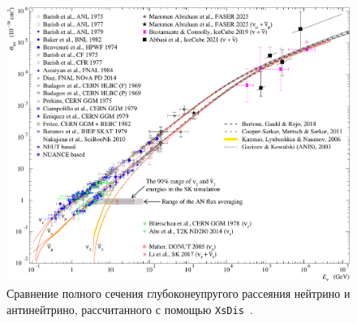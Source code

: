 \begin{figure}[!h]
\centering
\includegraphics[width=\linewidth]{images/dis_vs_data.pdf}
\caption{Сравнение полного сечения глубоконеупругого рассеяния нейтрино и антинейтрино, рассчитанного с помощью \texttt{XsDis}~\cite{kuzmin2006_finetuning,kuzmin2005_sumcc,kuzmin2006_axialmass}.}
\label{fig:disxs_compare}
\end{figure}

